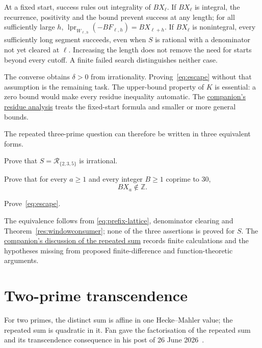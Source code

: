 \documentclass[11pt]{article}
\newcommand{\longrecord}[2]{\href{erdos269-running-lcm-reasoning-surface.pdf\##1}{#2}}
\begin{document}
At a fixed start, success rules out integrality of $BX_\ell$.
If $BX_\ell$ is integral, the recurrence, positivity and the bound prevent
success at any length; for all sufficiently large $h$,
$\operatorname{lpr}_{W_{\ell,h}}(-BF_{\ell,h})=BX_{\ell+h}$.
If $BX_\ell$ is nonintegral, every sufficiently long segment succeeds,
even when $S$ is rational with a denominator not yet cleared at $\ell$.
Increasing the length does not remove the need for starts beyond every
cutoff. A finite failed search distinguishes neither case.

The converse obtains $\delta>0$ from irrationality. Proving~\eqref{eq:escape}
without that assumption is the remaining task. The upper-bound property of $K$
is essential: a zero bound would make every residue inequality automatic.
The \longrecord{r3-residue}{companion's residue analysis} treats the fixed-start
formula and smaller or more general bounds.

\noindent\begin{minipage}{\linewidth}
The repeated three-prime question can therefore be written in three
equivalent forms.
\begin{problem}
Prove that $S=\mathcal R_{\{2,3,5\}}$ is irrational.
\end{problem}

\begin{problem}\label{prob:tails269}
Prove that for every $a\ge1$ and every integer $B\ge1$ coprime to $30$,
\begin{equation}\label{eq:tail-nonintegrality}
 BX_a\notin\mathbb Z.
\end{equation}
\end{problem}
\begin{problem}\label{prob:producer}
Prove~\eqref{eq:escape}.
\end{problem}
\end{minipage}

The equivalence follows from \eqref{eq:prefix-lattice}, denominator
clearing and Theorem~\ref{res:windowconsumer}; none of the three assertions
is proved for $S$. The \longrecord{r3-open}{companion's discussion of the
repeated sum} records finite calculations and the hypotheses missing
from proposed finite-difference and function-theoretic arguments.

\section{Two-prime transcendence}\label{sec:two-prime}
For two primes, the distinct sum is affine in one Hecke--Mahler value;
the repeated sum is quadratic in it.
Fan gave the factorisation of the repeated sum and its transcendence
consequence in his post of 26 June 2026~\cite{fan2026comment}.
\end{document}
